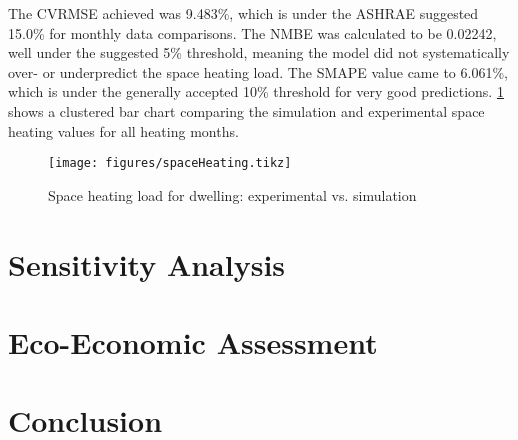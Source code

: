 The \ac{CVRMSE} achieved was 9.483\%, which is under the ASHRAE suggested 15.0\% for monthly data comparisons. The \ac{NMBE} was calculated to be 0.02242, well under the suggested 5\%  threshold, meaning the model did not systematically over- or underpredict the space heating load. The \ac{SMAPE} value came to 6.061\%, which is under the generally accepted 10\% threshold for very good predictions. \cref{fig:spaceheatingcalib} shows a clustered bar chart comparing the simulation and experimental space heating values for all heating months.  


\begin{figure}[htb]
    \centering
    \texttt{[image: figures/spaceHeating.tikz]}
    \caption{Space heating load for dwelling: experimental vs. simulation}
    \label{fig:spaceheatingcalib}
\end{figure}



\section{Sensitivity Analysis}

\section{Eco-Economic Assessment}\label{sec:methodecoeco}

\section{Conclusion}\label{sec:methodconclusion}


